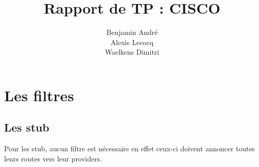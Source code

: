 \documentclass{article}
\author{Benjamin André\\Alexis Lecocq\\Waelkens Dimitri}
\title{Rapport de TP : CISCO}
\begin{document}
\maketitle


\section{Les filtres}

\subsection{Les stub}
Pour les stub, aucun filtre est nécessaire en effet ceux-ci doivent annoncer toutes leurs routes vers leur providers.
\subsection{}
\end{document}
